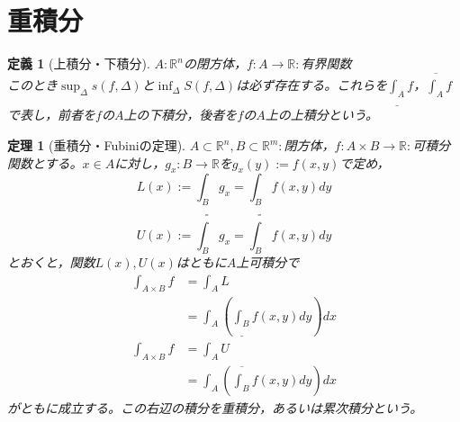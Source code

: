 \documentclass[dvipdfmx,a4j,10pt]{jsarticle}
\theoremstyle{mystyle1}
\newtheorem{thm}[dfn]{定理}
\theoremstyle{mystyle2}
\newtheorem{dfn*}{定義}
\begin{document}
\section{重積分}
\begin{dfn*}[上積分・下積分]
	$A:\mathbb{R}^n$の閉方体，$f:A\to\mathbb{R}:$有界関数\\
このとき$\displaystyle\sup_{\Delta}s(f,\Delta)$と$\displaystyle\inf_{\Delta}S(f,\Delta)$は必ず存在する。これらを$\displaystyle\underline{\int_A} f$，$\displaystyle\overline{\int_A}f$で表し，前者を$f$の$A$上の下積分，後者を$f$の$A$上の上積分という。
\end{dfn*}
\begin{framed}
	\begin{thm}[重積分・Fubiniの定理]\label{th3.10}
			$A\subset\mathbb{R}^n,B\subset\mathbb{R}^m:$閉方体，$f:A\times B\to\mathbb{R}:$可積分関数とする。$x\in A$に対し，$g_x:B\to\mathbb{R}$を$g_x(y):=f(x,y)$で定め，
			\[
				L(x):= \underline{\int_B}g_x= \underline{\int_B}f(x,y) dy
			\]
			\[
				U(x):= \overline{\int_B}g_x= \overline{\int_B}f(x,y) dy
			\]
			とおくと，関数$L(x),U(x)$はともに$A$上可積分で
			\[
			\begin{split}
			\int_{A\times B}f &= \int_A L\\
			&= \int_A\left(\underline{\int_B}f(x,y)dy\right)dx
			\end{split}
			\]
			\[
			\begin{split}
			\int_{A\times B}f &= \int_A U\\
			&= \int_A\left(\overline{\int_B}f(x,y)dy\right)dx
			\end{split}
			\]
			がともに成立する。この右辺の積分を重積分，あるいは累次積分という。
	\end{thm}
\end{framed}
\end{document}
